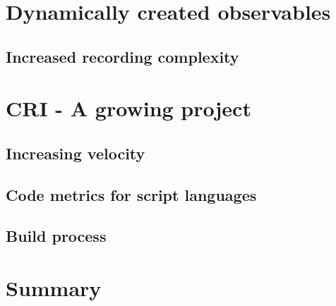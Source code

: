 \section{Dynamically created observables}

	\subsection{Increased recording complexity}
	
\section{CRI - A growing project}

	\subsection{Increasing velocity}
	
	\subsection{Code metrics for script languages}
	
	\subsection{Build process}
	
\section{Summary}

	



